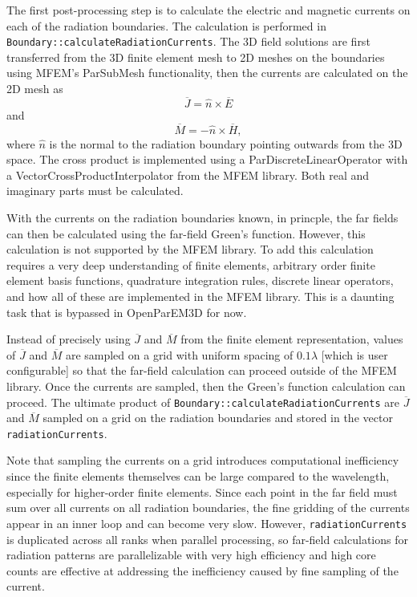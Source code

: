 \documentclass[titlepage]{article}
\renewcommand\_{\textunderscore\linebreak[1]}
\begin{document}
The first post-processing step is to calculate the electric and magnetic currents on each of the radiation boundaries.  The calculation is performed in \texttt{Boundary::calculateRadiationCurrents}.  The 3D field solutions are first transferred from the 3D finite element mesh to 2D meshes on the boundaries using MFEM's ParSubMesh functionality, then the currents are calculated on the 2D mesh as
\begin{equation}
\label{eq:J_current}
\overline{J}=\hat{n}\times\overline{E}
\end{equation}
and
\begin{equation}
\label{eq:M_current}
\overline{M}=-\hat{n}\times\overline{H},
\end{equation}
where $\hat{n}$ is the normal to the radiation boundary pointing outwards from the 3D space.  The cross product is implemented using a ParDiscreteLinearOperator with a VectorCrossProductInterpolator from the MFEM library.  Both real and imaginary parts must be calculated.

With the currents on the radiation boundaries known, in princple, the far fields can then be calculated using the far-field Green's function.  However, this calculation is not supported by the MFEM library.  To add this calculation requires a very deep understanding of finite elements, arbitrary order finite element basis functions, quadrature integration rules, discrete linear operators, and how all of these are implemented in the MFEM library.  This is a daunting task that is bypassed in OpenParEM3D for now.

Instead of precisely using $\overline{J}$ and $\overline{M}$ from the finite element representation, values of $\overline{J}$ and $\overline{M}$ are sampled on a grid with uniform spacing of $0.1\lambda$ [which is user configurable] so that the far-field calculation can proceed outside of the MFEM library.  Once the currents are sampled, then the Green's function calculation can proceed.
The ultimate product of \texttt{Boundary::calculateRadiationCurrents} are $\overline{J}$ and $\overline{M}$ sampled on a grid on the radiation boundaries and stored in the vector \texttt{radiationCurrents}.

Note that sampling the currents on a grid introduces computational inefficiency since the finite elements themselves can be large compared to the wavelength, especially for higher-order finite elements.  Since each point in the far field must sum over all currents on all radiation boundaries, the fine gridding of the currents appear in an inner loop and can become very slow.  However, \texttt{radiationCurrents} is duplicated across all ranks when parallel processing, so far-field calculations for radiation patterns are parallelizable with very high efficiency and high core counts are effective at addressing the inefficiency caused by fine sampling of the current.
\end{document}
